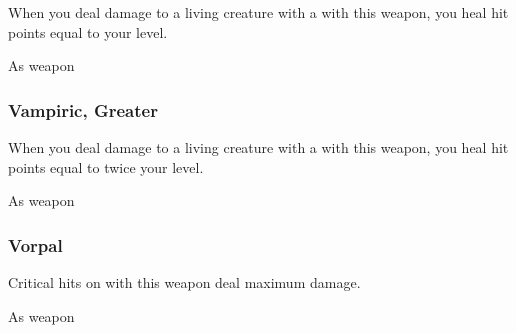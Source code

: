 When you deal damage to a living creature with a  with this weapon, you heal hit points equal to your level.



 


 As weapon


\lowercase{\hypertarget{item:Vampiric, Greater}{}}\label{item:Vampiric, Greater}
\hypertarget{item:Vampiric, Greater}{\subsubsection{Vampiric, Greater\hfill{}}}

When you deal damage to a living creature with a  with this weapon, you heal hit points equal to twice your level.



 


 As weapon


\lowercase{\hypertarget{item:Vorpal}{}}\label{item:Vorpal}
\hypertarget{item:Vorpal}{\subsubsection{Vorpal\hfill{}}}

Critical hits on  with this weapon deal maximum damage.



 As weapon
